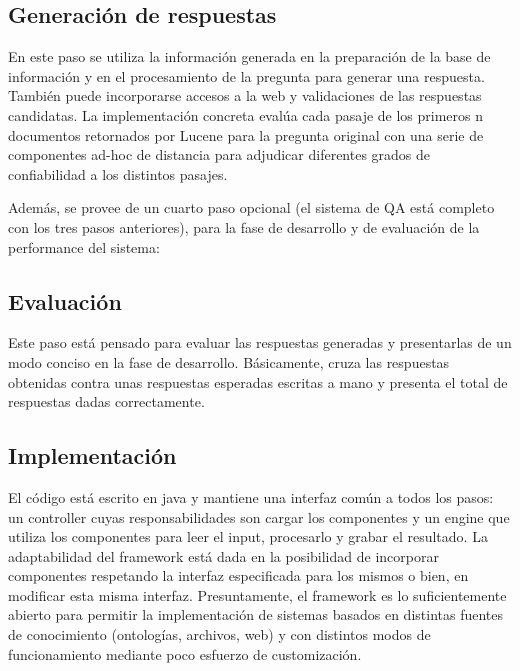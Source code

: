 \bigskip

\subsection{Generación de respuestas}
En este paso se utiliza la informaci\'on generada en la preparaci\'on
de la base de informaci\'on y en el procesamiento de la pregunta para
generar una respuesta. Tambi\'en puede incorporarse accesos a la web y
validaciones de las respuestas candidatas. La implementaci\'on concreta
eval\'ua cada pasaje de los primeros n documentos retornados por Lucene
para la pregunta original con una serie de componentes ad-hoc de
distancia para adjudicar diferentes grados de confiabilidad a los
distintos pasajes. \newline


Adem\'as, se provee de un cuarto paso opcional (el sistema de QA est\'a
completo con los tres pasos anteriores), para la fase de desarrollo y
de evaluaci\'on de la performance del sistema:\newline


\subsection{Evaluación}

Este paso est\'a pensado para evaluar las respuestas generadas y
presentarlas de un modo conciso en la fase de desarrollo.
B\'asicamente, cruza las respuestas obtenidas contra unas respuestas
esperadas escritas a mano y presenta el total de respuestas dadas
correctamente.


\bigskip

\subsection{Implementaci\'on}

El c\'odigo est\'a escrito en java y mantiene una interfaz com\'un a
todos los pasos: un controller cuyas responsabilidades son cargar los
componentes y un engine que utiliza los componentes para leer el input,
procesarlo y grabar el resultado. La adaptabilidad del framework est\'a
dada en la posibilidad de incorporar componentes respetando la interfaz
especificada para los mismos o bien, en modificar esta misma interfaz.
Presuntamente, el framework es lo suficientemente abierto para permitir
la implementaci\'on de sistemas basados en distintas fuentes de
conocimiento (ontolog\'ias, archivos, web) y con distintos modos de
funcionamiento mediante poco esfuerzo de customizaci\'on.

